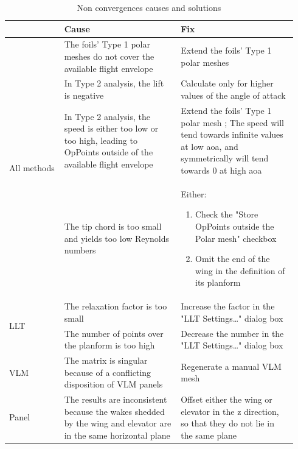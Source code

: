 \documentclass[a4paper,twoside,12pt,dvips]{article}
\begin{document}
\begin{table}[htbp]\scriptsize
  \centering
  \begin{tabular}{|m{0.18\linewidth}|m{0.38\linewidth}|m{0.38\linewidth}|}
    \hline
    &
    Cause &
    Fix \\
    \hline
    \multirow{4}{0.18\linewidth}{All methods} & 
    The foils' Type 1 polar meshes do not cover the available flight
    envelope &
    Extend the foils' Type 1 polar meshes \\
    \cline{2-3}
    &
    In Type 2 analysis, the lift is negative &
    Calculate only for higher values of the angle of attack \\
    \cline{2-3}
    &
    In Type 2 analysis, the speed is either too low or too high,
    leading to OpPoints outside of the available flight envelope &
    Extend the foils' Type 1 polar mesh ; The speed will tend towards
    infinite values at low aoa, and symmetrically will tend towards 0 at
    high aoa \\
    \cline{2-3}
    &
    The tip chord is too small and yields too low Reynolds numbers &
    Either: 
    \begin{enumerate}
    \item Check the "Store OpPoints outside the Polar mesh" checkbox
    \item Omit the end of the wing in the definition of its planform
    \end{enumerate} \\
    \hline
    \multirow{2}{0.18\linewidth}{LLT} & 
    The relaxation factor is too small &
    Increase the factor in the "LLT Settings…" dialog box \\
    \cline{2-3}
    &
    The number of points over the planform is too high &
    Decrease the number in the "LLT Settings…" dialog box \\
    \hline
    VLM &
    The matrix is singular because of a conflicting disposition of VLM panels &
    Regenerate a manual VLM mesh \\
    \hline
    Panel &
    The results are inconsistent because the wakes shedded by the wing
    and elevator are in the same horizontal plane &
    Offset either the wing or elevator in the z direction, so that they do not lie in the same plane \\
    \hline
  \end{tabular}
  \caption{Non convergences causes and solutions}
  \label{tab:non_convergences_causes_and_solutions}
\end{table}
\end{document}
